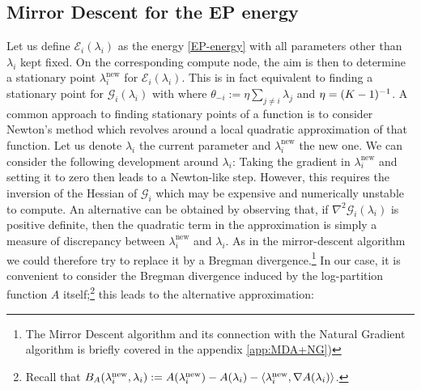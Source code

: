 \subsection{\label{point:MD-for-EP}Mirror Descent for the EP energy}
Let us define $\mathcal E_i(\lambda_i)$ as the energy \eqref{EP-energy} with all parameters other than $\lambda_i$ kept fixed. On the corresponding compute node, the aim is then to determine a stationary point $\lambda_i^{\text{new}}$ for $\mathcal E_i(\lambda_i)$. This is in fact equivalent to finding a stationary point for $\mathcal G_i(\lambda_i)$ with
where $\theta_{-i}:=\eta\sum_{j\neq i}\lambda_j$ and $\eta=(K-1)^{-1}$. A common approach to finding stationary points of a function is to consider Newton's method which revolves around a local quadratic approximation of that function. Let us denote $\lambda_i$ the current parameter and $\lambda_i^{\text{new}}$ the new one. We can consider the following development around $\lambda_i$:
%
%
Taking the gradient in $\lambda_i^{\text{new}}$ and setting it to zero then leads to a Newton-like step. However, this requires the inversion of the Hessian of $\mathcal G_i$ which may be expensive and numerically unstable to compute. An alternative can be obtained by observing that, if $\nabla^{2}\mathcal G_i(\lambda_i)$ is positive definite, then the quadratic term in the approximation is simply a measure of discrepancy between $\lambda_i^{\text{new}}$ and $\lambda_i$. As in the mirror-descent algorithm \citep{nemirovski83, beck03} we could therefore try to replace it by a Bregman divergence.\footnote{The Mirror Descent algorithm and its connection with the Natural Gradient algorithm is briefly covered in the appendix \ref{app:MDA+NG})} In our case, it is convenient to consider the Bregman divergence induced by the log-partition function $A$ itself;\footnote{Recall that $B_A(\lambda_i^{\text{new}},\lambda_i):=A(\lambda_i^{\text{new}})-A(\lambda_i)-\left\langle \lambda_i^{\text{new}},\nabla A(\lambda_i) \right\rangle$.} this leads to the alternative approximation:
